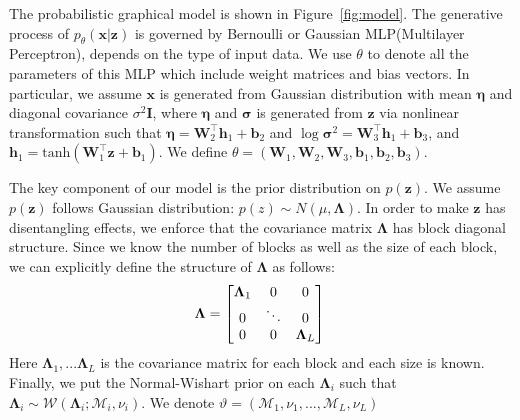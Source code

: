 The probabilistic graphical model is shown in Figure~\ref{fig:model}.
The generative process of $p_{\theta}(\mathbf{x}|\mathbf{z})$ is governed by Bernoulli or Gaussian MLP(Multilayer Perceptron), depends on the type of input data. We use $\theta$ to denote all the parameters of this MLP which include weight matrices and bias vectors. In particular, we assume $\mathbf{x}$ is generated from Gaussian distribution with mean $\mathbf{\eta}$ and diagonal covariance $\sigma^2\mathbf{I}$, where $\mathbf{\eta}$ and $\mathbf{\sigma}$ is generated from $\mathbf{z}$ via nonlinear transformation such that $\mathbf{\eta} = \mathbf{W}_2^\top\mathbf{h}_1 + \mathbf{b}_2$ and $\log \mathbf{\sigma}^2 = \mathbf{W}_3^\top\mathbf{h}_1 + \mathbf{b}_3$, and $\mathbf{h}_1 = \mbox{tanh}(\mathbf{W}_1^\top\mathbf{z} + \mathbf{b}_1)$. We define $\theta=(\mathbf{W}_1, \mathbf{W}_2,\mathbf{W}_3, \mathbf{b}_1, \mathbf{b}_2,\mathbf{b}_3)$.

The key component of our model is the prior distribution on $p(\mathbf{z})$. We assume $p(\mathbf{z})$ follows Gaussian distribution: $p(z)\sim N(\mu, \mathbf{\Lambda})$. In order to make $\mathbf{z}$ has disentangling effects, we enforce that the covariance matrix $\mathbf{\Lambda}$ has block diagonal structure. Since we know the number of blocks as well as the size of each block, we can explicitly define the structure of $\mathbf{\Lambda}$ as follows:
\begin{equation*}
\mathbf{\Lambda} = \begin{bmatrix}
\mathbf{\Lambda}_1 & 0 & 0 \\
0 & \ddots & 0  \\
0 & 0 & \mathbf{\Lambda}_{L}
\end{bmatrix} \\
\end{equation*}
Here $\mathbf{\Lambda}_1,...\mathbf{\Lambda}_L$ is the covariance matrix for each block and each size is known. Finally, we put the Normal-Wishart prior on each $\mathbf{\Lambda}_i$ such that $\mathbf{\mathbf{\Lambda}}_{i} \sim \mathcal{W}(\mathbf{\Lambda}_{i}; \mathcal{M}_{i}, \nu_{i})$. We denote $\vartheta=(\mathcal{M}_{1}, \nu_{1},...,\mathcal{M}_{L}, \nu_{L})$

